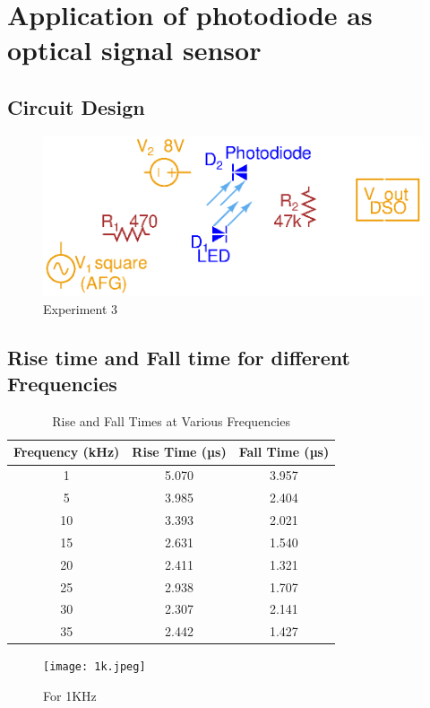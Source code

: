 \documentclass[a4paper]{article}
\begin{document}
\newpage
\section{Application of photodiode as optical signal sensor}
\subsection{Circuit Design}
\begin{figure}[ht]
    \centering
    \includegraphics{Lab_3_Circuit_Design_Exp_3.eps}
    \caption{Experiment 3}
\end{figure}
\subsection{Rise time and Fall time for different Frequencies}

\begin{table}[h!]
\centering
\begin{tabular}{|c|c|c|}
\hline
\textbf{Frequency (kHz)} & \textbf{Rise Time (µs)} & \textbf{Fall Time (µs)} \\ \hline
1 & 5.070 & 3.957 \\ \hline
5 & 3.985 & 2.404 \\ \hline
10 & 3.393 & 2.021 \\ \hline
15 & 2.631 & 1.540 \\ \hline
20 & 2.411 & 1.321 \\ \hline
25 & 2.938 & 1.707 \\ \hline
30 & 2.307 & 2.141 \\ \hline
35 & 2.442 & 1.427 \\ \hline
\end{tabular}
\caption{Rise and Fall Times at Various Frequencies}
\label{tab:rise_fall_times}
\end{table}


\begin{figure}[h!]
    \centering
    \texttt{[image: 1k.jpeg]}
    \caption{For 1KHz}
\end{figure}
\end{document}
